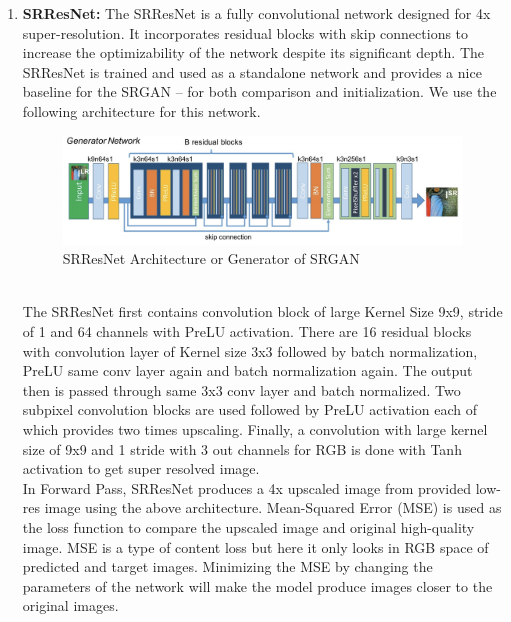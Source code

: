 \begin{enumerate}
    \item {\bf SRResNet:} The SRResNet is a fully convolutional network designed for 4x super-resolution. It incorporates residual blocks with skip connections to increase the optimizability of the network despite its significant depth. The SRResNet is trained and used as a standalone network and provides a nice baseline for the SRGAN – for both comparison and initialization. We use the following architecture for this network. 
    \begin{figure}[ht]
        \centering
        \includegraphics[width=6in]{./figures/generator.png}
        \caption{SRResNet Architecture or Generator of SRGAN}
    \end{figure} \\
    The SRResNet first contains convolution block of large Kernel Size 9x9, stride of 1 and 64 channels with PreLU activation. There are 16 residual blocks with convolution layer of Kernel size 3x3 followed by batch normalization, PreLU same conv layer again and batch normalization again. The output then is passed through same 3x3 conv layer and batch normalized. Two subpixel convolution blocks are used followed by PreLU activation each of which provides two times upscaling. Finally, a convolution with large kernel size of 9x9 and 1 stride with 3 out channels for RGB is done with Tanh activation to get super resolved image.\\ In Forward Pass, SRResNet produces a 4x upscaled image from provided low-res image using the above architecture. Mean-Squared Error (MSE) is used as the loss function to compare the upscaled image and original high-quality image. MSE is a type of content loss but here it only looks in RGB space of predicted and target images. Minimizing the MSE by changing the parameters of the network will make the model produce images closer to the original images.
    

\end{enumerate}
